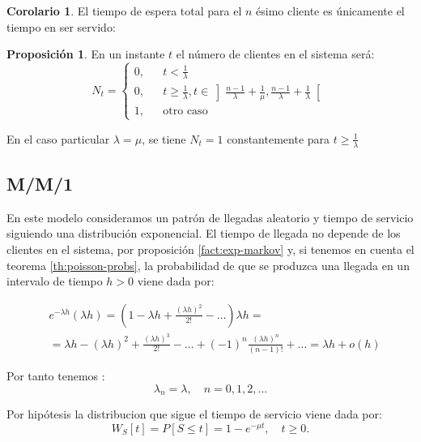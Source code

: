\documentclass[a4paper,10pt]{scrartcl}
\theoremstyle{definition}
\newtheorem*{fact*}{Proposición}
\newtheorem*{corollary*}{Corolario}
\theoremstyle{definition}
\newtheorem*{fact*}{Proposición}
\newtheorem*{corollary*}{Corolario}
\numberwithin{equation}{section}
\begin{document}
	\begin{corollary*}
		El tiempo de espera total para el $n$ ésimo cliente es únicamente el tiempo en ser servido:
		
		
	\end{corollary*}
	
	\begin{fact*}
		En un instante $t$ el número de clientes en el sistema será: 
		\[N_t = \left\{\begin{array}{lcc}
		0, && t < \frac{1}{\lambda}\\
		0, && t \ge \frac{1}{\lambda}, t \in \left]\frac{n-1}{\lambda} + \frac{1}{\mu}, \frac{n-1}{\lambda} + \frac{1}{\lambda}\right[\\
		1, && \text{otro caso}
		\end{array}\right.\]
	\end{fact*}
	
	En el caso particular $\lambda = \mu$, se tiene $N_t = 1$ constantemente para $t\ge \frac{1}{\lambda}$
	
	\subsection{M/M/1}
	
	En este modelo consideramos un patrón de llegadas aleatorio y tiempo de servicio siguiendo una distribución 
	exponencial. El tiempo de llegada no depende de los clientes en el sistema, por proposición \ref{fact:exp-markov}
	y, si tenemos en cuenta el teorema \ref{th:poisson-probs}, la probabilidad de que se produzca una llegada 
	en un intervalo de tiempo $h>0$ viene dada por:
	
	\begin{align*}
	& e^{-\lambda h}(\lambda h)= \left(1-\lambda h+\frac{(\lambda h)^2}{2!}- \dots\right) \lambda h = \\
	& =\lambda h-(\lambda h)^2+\frac{(\lambda h)^3}{2!}-\dots+(-1)^n\frac{(\lambda h)^n}{(n-1)!} + \ldots = \lambda h+o(h)
	\end{align*}
	
	Por tanto tenemos :
	\begin{equation*}
	\lambda_n=\lambda, \quad n=0,1,2,\dots
	\end{equation*}
	
	Por hipótesis la distribucion que sigue el tiempo de servicio viene dada por:
	\begin{equation*}
	W_S[t] = P[S\leq t] = 1-e^{-\mu t}, \quad t\ge 0.
	\end{equation*}
	
\end{document}
